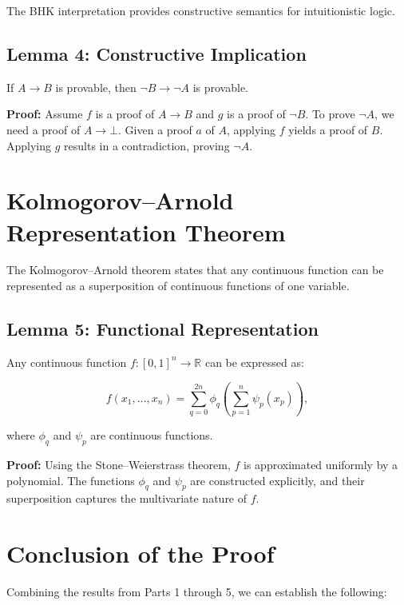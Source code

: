 \documentclass{article}
\begin{document}
The BHK interpretation provides constructive semantics for intuitionistic logic.

\subsection{Lemma 4: Constructive Implication}
If \( A \rightarrow B \) is provable, then \( \neg B \rightarrow \neg A \) is provable.

\textbf{Proof:}
Assume \( f \) is a proof of \( A \rightarrow B \) and \( g \) is a proof of \( \neg B \). To prove \( \neg A \), we need a proof of \( A \rightarrow \bot \). Given a proof \( a \) of \( A \), applying \( f \) yields a proof of \( B \). Applying \( g \) results in a contradiction, proving \( \neg A \).


\section{Kolmogorov–Arnold Representation Theorem}

The Kolmogorov–Arnold theorem states that any continuous function can be represented as a superposition of continuous functions of one variable.

\subsection{Lemma 5: Functional Representation}
Any continuous function \( f: [0, 1]^n \rightarrow \mathbb{R} \) can be expressed as:

\[
f(x_1, \dots, x_n) = \sum_{q=0}^{2n} \phi_q\left(\sum_{p=1}^{n} \psi_p(x_p)\right),
\]

where \( \phi_q \) and \( \psi_p \) are continuous functions.

\textbf{Proof:} Using the Stone–Weierstrass theorem, \( f \) is approximated uniformly by a polynomial. The functions \( \phi_q \) and \( \psi_p \) are constructed explicitly, and their superposition captures the multivariate nature of \( f \).

\section{Conclusion of the Proof}

Combining the results from Parts 1 through 5, we can establish the following:
\end{document}

